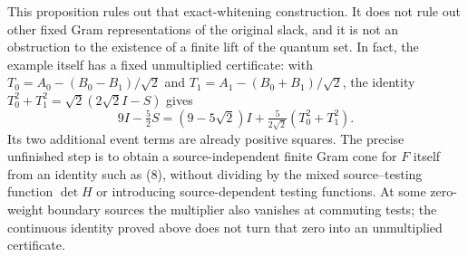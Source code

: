 \documentclass[11pt]{article}
\begin{document}
This proposition rules out that exact-whitening construction.  It does
not rule out other fixed Gram representations of the original slack,
and it is not an obstruction to the existence of a finite lift of the
quantum set.  In fact, the example itself has a fixed unmultiplied
certificate: with $T_0=A_0-(B_0-B_1)/\sqrt2$ and
$T_1=A_1-(B_0+B_1)/\sqrt2$, the identity
$T_0^2+T_1^2=\sqrt2(2\sqrt2I-S)$ gives
\[
 9I-\tfrac52S=(9-5\sqrt2)I+
                 \tfrac5{2\sqrt2}(T_0^2+T_1^2).
\]
Its two additional event terms are already positive squares.
The precise unfinished step is to obtain a source-independent
finite Gram cone for $F$ itself from an identity such as (8), without
dividing by the mixed source--testing function $\det H$ or introducing
source-dependent testing functions.  At some zero-weight boundary
sources the multiplier also vanishes at commuting tests; the continuous
identity proved above does not turn that zero into an unmultiplied
certificate.
\end{document}

